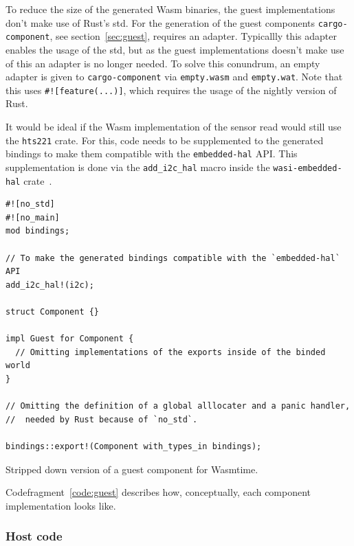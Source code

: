 To reduce the size of the generated Wasm binaries, the guest implementations don't make use of Rust's std. For the generation of the guest components \texttt{cargo-component}, see section~\ref{sec:guest}, requires an adapter. Typicallly this adapter enables the usage of the std, but as the guest implementations doesn't make use of this an adapter is no longer needed. To solve this conundrum, an empty adapter is given to \texttt{cargo-component} via \texttt{empty.wasm} and \texttt{empty.wat}. Note that this uses \texttt{\#![feature(...)]}, which requires the usage of the nightly version of Rust.

It would be ideal if the \gls{Wasm} implementation of the sensor read would still use the \texttt{hts221} crate. For this, code needs to be supplemented to the generated bindings to make them compatible with the \texttt{embedded-hal} API. This supplementation is done via the \texttt{add\_i2c\_hal} macro inside the \texttt{wasi-embedded-hal} crate~\cite{gh:weh}.

\begin{listing}[h]
\begin{verbatim}
#![no_std]
#![no_main]
mod bindings;

// To make the generated bindings compatible with the `embedded-hal` API
add_i2c_hal!(i2c);

struct Component {}

impl Guest for Component {
  // Omitting implementations of the exports inside of the binded world
}

// Omitting the definition of a global alllocater and a panic handler,
//  needed by Rust because of `no_std`.

bindings::export!(Component with_types_in bindings);
\end{verbatim}
\caption{Stripped down version of a guest component for Wasmtime.}
\label{code:guest}
\end{listing}

Codefragment~\ref{code:guest} describes how, conceptually, each component implementation looks like.

\subsubsection{Host code}

